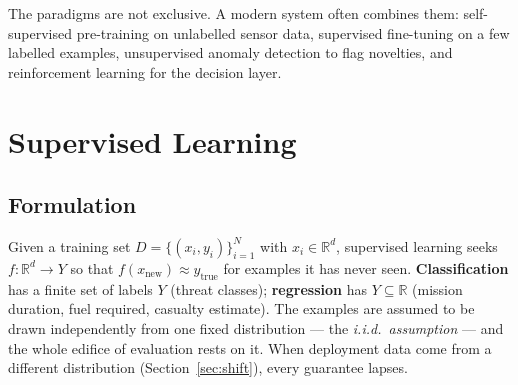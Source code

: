 \documentclass[11pt]{article}
\begin{document}
The paradigms are not exclusive. A modern system often combines them: self-supervised pre-training on unlabelled sensor data, supervised fine-tuning on a few labelled examples, unsupervised anomaly detection to flag novelties, and reinforcement learning for the decision layer.

\section{Supervised Learning}
\subsection{Formulation}
Given a training set $D=\{(x_i,y_i)\}_{i=1}^N$ with $x_i\in\mathbb R^d$, supervised learning seeks $f:\mathbb R^d\to Y$ so that $f(x_{\text{new}})\approx y_{\text{true}}$ for examples it has never seen. \textbf{Classification} has a finite set of labels $Y$ (threat classes); \textbf{regression} has $Y\subseteq\mathbb R$ (mission duration, fuel required, casualty estimate). The examples are assumed to be drawn independently from one fixed distribution --- the \emph{i.i.d.\ assumption} --- and the whole edifice of evaluation rests on it. When deployment data come from a different distribution (Section~\ref{sec:shift}), every guarantee lapses.
\end{document}
